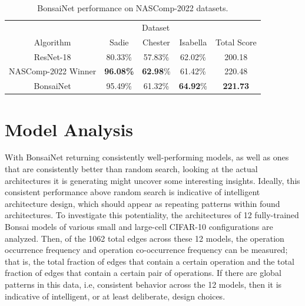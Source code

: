 \begin{table}[h]
\begin{center}
\begin{tabular}{c|ccc|c}
					& \multicolumn{3}{c|}{Dataset} \\
Algorithm 			& Sadie	 			& Chester 			& Isabella 			& Total Score		\\ \hline
ResNet-18			& 80.33\% 			& 57.83\%			& 62.02\%			& 200.18			\\
NASComp-2022 Winner	& \textbf{96.08\%}	& \textbf{62.98}\%	& 61.42\%			& 220.48			\\ \hline
BonsaiNet			& 95.49\%			& 61.32\%			& \textbf{64.92}\%	& \textbf{221.73}	\\
\end{tabular}
\end{center}
\caption[BonsaiNet performance on NASComp-2022 datasets]{BonsaiNet performance on NASComp-2022 datasets.}
\label{tab:bonsai_nascomp}
\end{table}

\section{Model Analysis}
With BonsaiNet returning consistently well-performing models, as well as ones that are consistently better than random search,
looking at the actual architectures it is generating might uncover some interesting insights. Ideally,
this consistent performance above random search is indicative of intelligent architecture design, which should appear
as repeating patterns within found architectures. To investigate this potentiality, the architectures of 12 fully-trained
Bonsai models of various small and large-cell CIFAR-10 configurations are analyzed. Then, of the 1062 total edges
across these 12 models, the operation occurrence frequency and operation co-occurrence frequency can be measured; that
is, the total fraction of edges that contain a certain operation and the total fraction of edges that contain a certain
pair of operations. If there are global patterns in this data, i.e, consistent behavior across the 12 models, then it is
indicative of intelligent, or at least deliberate, design choices.

